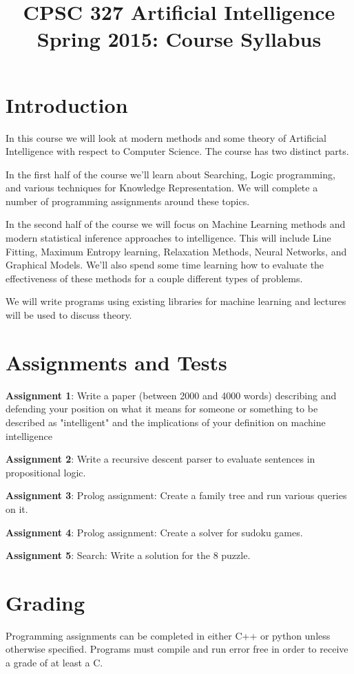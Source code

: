 \documentclass[]{article}
\begin{document}
\title{CPSC 327 Artificial Intelligence Spring 2015: Course Syllabus}

\maketitle
\section{Introduction}
In this course we will look at modern methods and some theory of Artificial Intelligence with respect to Computer Science.  The course has two distinct parts.  

In the first half of the course we'll learn about Searching, Logic programming, and various techniques for Knowledge Representation.  We will complete a number of programming assignments around these topics.

In the second half of the course we will focus on Machine Learning methods and modern statistical inference approaches to intelligence.  This will include Line Fitting, Maximum Entropy learning, Relaxation Methods, Neural Networks, and Graphical Models.  We'll also spend some time learning how to evaluate the effectiveness of these methods for a couple different types of problems. 

We will write programs using existing libraries for machine learning and lectures will be used to discuss theory.

\section{Assignments and Tests}
\textbf{Assignment 1}:  Write a paper (between 2000 and 4000 words) describing and defending your position on what it means for someone or something to be described as "intelligent" and the implications of your definition on machine intelligence

\noindent
\textbf{Assignment 2}:  Write a recursive descent parser to evaluate sentences in propositional logic.

\noindent 
\textbf{Assignment 3}:  Prolog assignment:  Create a family tree and run various queries on it.

\noindent
\textbf{Assignment 4}:  Prolog assignment: Create a solver for sudoku games.
  
\noindent 
\textbf{Assignment 5}:  Search: Write a solution for the 8 puzzle. 

\section{Grading}
Programming assignments can be completed in either C++ or python unless otherwise specified.  Programs must compile and run error free in order to receive a grade of at least a C. 
\end{document}
